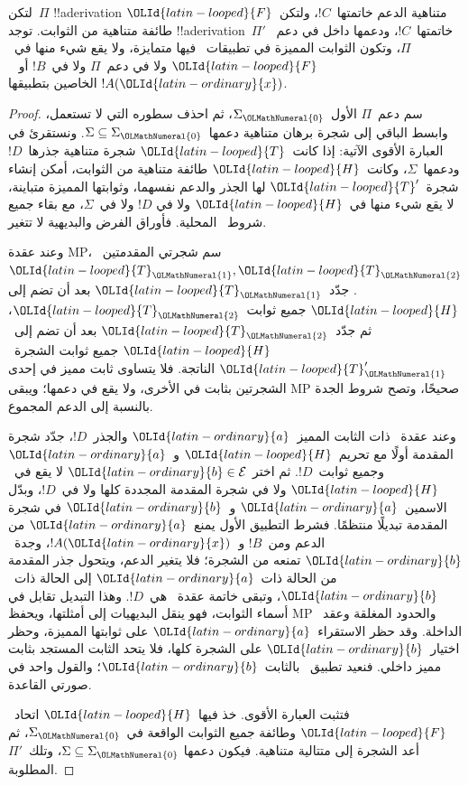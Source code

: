 \documentclass[../../../include/open-logic-section]{subfiles}
\begin{document}
\begin{lem}
لتكن~$\Pi$ !!a{derivation} متناهية الدعم خاتمتها~$!C$، ولتكن~${\OLId{latin-looped}{F}}$
طائفة متناهية من الثوابت. توجد !!a{derivation}~$\Pi'$ خاتمتها~$!C$،
ودعمها داخل في دعم~$\Pi$، وتكون الثوابت المميزة في تطبيقات~\QR{} فيها
متمايزة، ولا يقع شيء منها في~${\OLId{latin-looped}{F}}$ ولا في دعم~$\Pi$ ولا في~$!B$ أو
~$!A({\OLId{latin-ordinary}{x}})$ الخاصين بتطبيقها.
\end{lem}

\begin{proof}
سم دعم~$\Pi$ الأول~$\Sigma_{\OLMathNumeral{0}}$، ثم احذف سطوره التي لا تستعمل، وابسط
الباقي إلى شجرة برهان متناهية دعمها~$\Sigma\subseteq\Sigma_{\OLMathNumeral{0}}$.
ونستقرئ في العبارة الأقوى الآتية: إذا كانت~${\OLId{latin-looped}{T}}$ شجرة متناهية جذرها~$!D$
ودعمها~$\Sigma$، وكانت~${\OLId{latin-looped}{H}}$ طائفة متناهية من الثوابت، أمكن إنشاء
شجرة~${\OLId{latin-looped}{T}}'$ لها الجذر والدعم نفسهما، وثوابتها المميزة متباينة، لا يقع شيء منها في~${\OLId{latin-looped}{H}}$ ولا في
$!D$ ولا في~$\Sigma$، مع بقاء جميع شروط~\QR{} المحلية. فأوراق الفرض
والبديهية لا تتغير.

وعند عقدة MP، سم شجرتي المقدمتين~${\OLId{latin-looped}{T}}_{\OLMathNumeral{1}},{\OLId{latin-looped}{T}}_{\OLMathNumeral{2}}$. جدّد~${\OLId{latin-looped}{T}}_{\OLMathNumeral{1}}$ بعد أن تضم إلى
${\OLId{latin-looped}{H}}$ جميع ثوابت~${\OLId{latin-looped}{T}}_{\OLMathNumeral{2}}$، ثم جدّد~${\OLId{latin-looped}{T}}_{\OLMathNumeral{2}}$ بعد أن تضم إلى~${\OLId{latin-looped}{H}}$ جميع ثوابت
الشجرة~${\OLId{latin-looped}{T}}'_{\OLMathNumeral{1}}$ الناتجة. فلا يتساوى ثابت مميز في إحدى الشجرتين بثابت في الأخرى،
ولا يقع في دعمها؛ ويبقى MP صحيحًا، وتصح شروط الجدة بالنسبة إلى الدعم
المجموع.

وعند عقدة~\QR{} ذات الثابت المميز~${\OLId{latin-ordinary}{a}}$ والجذر~$!D$، جدّد شجرة المقدمة
أولًا مع تحريم~${\OLId{latin-looped}{H}}$ و~${\OLId{latin-ordinary}{a}}$ وجميع ثوابت~$!D$. ثم اختر
${\OLId{latin-ordinary}{b}}\in\mathcal E$ لا يقع في~${\OLId{latin-looped}{H}}$ ولا في شجرة المقدمة المجددة كلها ولا
في~$!D$، وبدّل الاسمين~${\OLId{latin-ordinary}{a}}$ و~${\OLId{latin-ordinary}{b}}$ في شجرة المقدمة تبديلًا منتظمًا.
فشرط التطبيق الأول يمنع~${\OLId{latin-ordinary}{a}}$ من الدعم ومن~$!B$ و~$!A({\OLId{latin-ordinary}{x}})$، وجدة~${\OLId{latin-ordinary}{b}}$
تمنعه من الشجرة؛ فلا يتغير الدعم، ويتحول جذر المقدمة من الحالة ذات~${\OLId{latin-ordinary}{a}}$
إلى الحالة ذات~${\OLId{latin-ordinary}{b}}$، وتبقى خاتمة عقدة~\QR{} هي~$!D$. وهذا التبديل
تقابل في أسماء الثوابت، فهو ينقل البديهيات إلى أمثلتها، ويحفظ MP والحدود
المغلقة وعقد~\QR{} الداخلة. وقد حظر الاستقراء~${\OLId{latin-ordinary}{a}}$ على ثوابتها المميزة،
وحظر اختيار~${\OLId{latin-ordinary}{b}}$ على الشجرة كلها، فلا يتحد الثابت المستجد بثابت مميز داخلي.
فنعيد تطبيق~\QR{} بالثابت~${\OLId{latin-ordinary}{b}}$؛ والقول واحد في صورتي القاعدة.

فتثبت العبارة الأقوى. خذ فيها~${\OLId{latin-looped}{H}}$ اتحاد~${\OLId{latin-looped}{F}}$ وطائفة جميع الثوابت الواقعة
في~$\Sigma_{\OLMathNumeral{0}}$، ثم أعد الشجرة إلى متتالية متناهية. فيكون دعمها
$\Sigma\subseteq\Sigma_{\OLMathNumeral{0}}$، وتلك~$\Pi'$ المطلوبة.
\end{proof}
\end{document}
